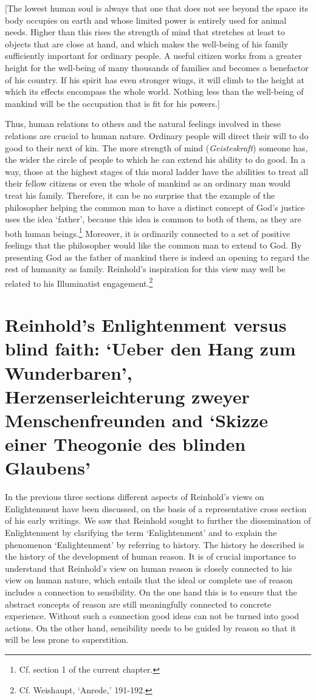 [The lowest human soul is always that one that does not see beyond the space its body occupies on earth and whose limited power is entirely used for animal needs. Higher than this rises the strength of mind that stretches at least to objects that are close at hand, and which makes the well{-}being of his family sufficiently important for ordinary people. A useful citizen works from a greater height for the well{-}being of many thousands of families and becomes a benefactor of his country. If his spirit has even stronger wings, it will climb to the height at which its effects encompass the whole world. Nothing less than the well{-}being of mankind will be the occupation that is fit for his powers.] 

Thus, human relations to others and the natural feelings involved in these relations are crucial to human nature. Ordinary people will direct their will to do good to their next of kin. The more strength of mind (\textit{Geisteskraft}) someone has, the wider the circle of people to which he can extend his ability to do good. In a way, those at the highest stages of this moral ladder have the abilities to treat all their fellow citizens or even the whole of mankind as an ordinary man would treat his family. Therefore, it can be no surprise that the example of the philosopher helping the common man to have a distinct concept of God's justice uses the idea `father', because this idea is common to both of them, as they are both human beings.\footnote{ Cf. section 1 of the current chapter. } Moreover, it is ordinarily connected to a set of positive feelings that the philosopher would like the common man to extend to God. By presenting God as the father of mankind there is indeed an opening to regard the rest of humanity as family. Reinhold's inspiration for this view may well be related to his Illuminatist engagement.\footnote{ Cf. Weishaupt, `Anrede,' 191{-}192.}


\section{Reinhold's Enlightenment versus blind faith: `Ueber den Hang zum Wunderbaren', Herzenserleichterung zweyer Menschenfreunden and `Skizze einer Theogonie des blinden Glaubens'}


In the previous three sections different aspects of Reinhold's views on Enlightenment have been discussed, on the basis of a representative cross section of his early writings. We saw that Reinhold sought to further the dissemination of Enlightenment by clarifying the term `Enlightenment' and to explain the phenomenon `Enlightenment' by referring to history. The history he described is the history of the development of human reason. It is of crucial importance to understand that Reinhold's view on human reason is closely connected to his view on human nature, which entails that the ideal or complete use of reason includes a connection to sensibility. On the one hand this is to ensure that the abstract concepts of reason are still meaningfully connected to concrete experience. Without such a connection good ideas can not be turned into good actions. On the other hand, sensibility needs to be guided by reason so that it will be less prone to superstition. 

